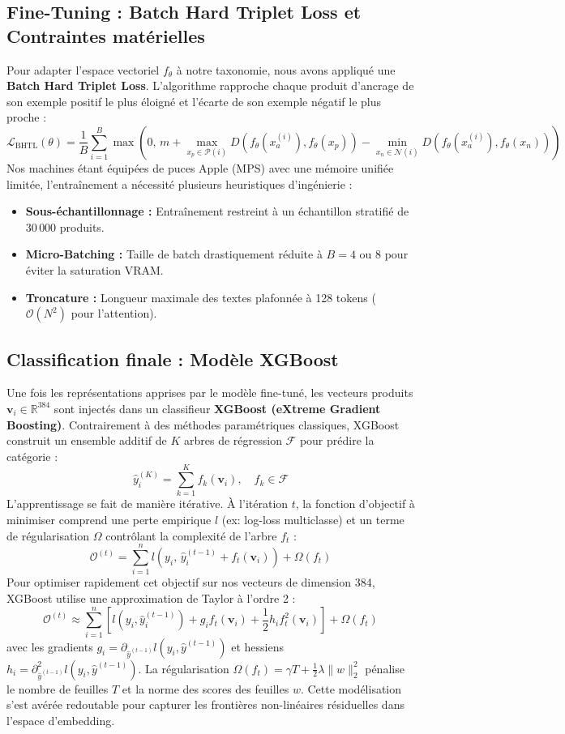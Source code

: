 \documentclass[11pt,a4paper]{article}
\begin{document}
\subsection{Fine-Tuning : Batch Hard Triplet Loss et Contraintes matérielles}
Pour adapter l'espace vectoriel $f_\theta$ à notre taxonomie, nous avons appliqué une \textbf{Batch Hard Triplet Loss}. L'algorithme rapproche chaque produit d'ancrage de son exemple positif le plus éloigné et l'écarte de son exemple négatif le plus proche :
\[
\mathcal{L}_{\text{BHTL}}(\theta) = \frac{1}{B} \sum_{i=1}^{B} \max \left( 0, \, m + \max_{x_p \in \mathcal{P}(i)} D(f_\theta(x_a^{(i)}), f_\theta(x_p)) - \min_{x_n \in \mathcal{N}(i)} D(f_\theta(x_a^{(i)}), f_\theta(x_n)) \right)
\]
Nos machines étant équipées de puces Apple (MPS) avec une mémoire unifiée limitée, l'entraînement a nécessité plusieurs heuristiques d'ingénierie :
\begin{itemize}
    \item \textbf{Sous-échantillonnage :} Entraînement restreint à un échantillon stratifié de $30\,000$ produits.
    \item \textbf{Micro-Batching :} Taille de batch drastiquement réduite à $B=4$ ou $8$ pour éviter la saturation VRAM.
    \item \textbf{Troncature :} Longueur maximale des textes plafonnée à 128 tokens ($\mathcal{O}(N^2)$ pour l'attention).
\end{itemize}

\subsection{Classification finale : Modèle XGBoost}

Une fois les représentations apprises par le modèle fine-tuné, les vecteurs produits $\mathbf{v}_i \in \mathbb{R}^{384}$ sont injectés dans un classifieur \textbf{XGBoost (eXtreme Gradient Boosting)}. Contrairement à des méthodes paramétriques classiques, XGBoost construit un ensemble additif de $K$ arbres de régression $\mathcal{F}$ pour prédire la catégorie :
\[
\widehat{y}_i^{(K)} = \sum_{k=1}^K f_k(\mathbf{v}_i), \quad f_k \in \mathcal{F}
\]
L'apprentissage se fait de manière itérative. À l'itération $t$, la fonction d'objectif à minimiser comprend une perte empirique $l$ (ex: log-loss multiclasse) et un terme de régularisation $\Omega$ contrôlant la complexité de l'arbre $f_t$ :
\[
\mathcal{O}^{(t)} = \sum_{i=1}^n l\left(y_i, \, \widehat{y}_i^{(t-1)} + f_t(\mathbf{v}_i)\right) + \Omega(f_t)
\]
Pour optimiser rapidement cet objectif sur nos vecteurs de dimension 384, XGBoost utilise une approximation de Taylor à l'ordre 2 :
\[
\mathcal{O}^{(t)} \approx \sum_{i=1}^n \left[ l(y_i, \widehat{y}_i^{(t-1)}) + g_i f_t(\mathbf{v}_i) + \frac{1}{2} h_i f_t^2(\mathbf{v}_i) \right] + \Omega(f_t)
\]
avec les gradients $g_i = \partial_{\widehat{y}^{(t-1)}} l(y_i, \widehat{y}^{(t-1)})$ et hessiens $h_i = \partial^2_{\widehat{y}^{(t-1)}} l(y_i, \widehat{y}^{(t-1)})$. La régularisation $\Omega(f_t) = \gamma T + \frac{1}{2} \lambda \|w\|^2_2$ pénalise le nombre de feuilles $T$ et la norme des scores des feuilles $w$. Cette modélisation s'est avérée redoutable pour capturer les frontières non-linéaires résiduelles dans l'espace d'embedding.
\end{document}
